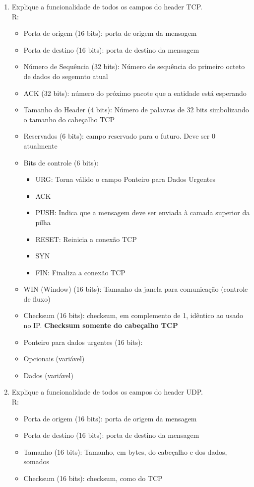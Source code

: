 \documentclass{article}
\begin{document}
\begin{enumerate}
	\item Explique a funcionalidade de todos os campos do header TCP.
	\\
	R: 
	\begin{itemize}
		\item Porta de origem (16 bits): porta de origem da mensagem
		\item Porta de destino (16 bits): porta de destino da mensagem
		\item Número de Sequência (32 bits): Número de sequência do primeiro octeto de dados do segemnto atual
		\item ACK (32 bits): número do próximo pacote que a entidade está esperando
		\item Tamanho do Header (4 bits): Número de palavras de 32 bits simbolizando o tamanho do cabeçalho TCP
		\item Reservados (6 bits): campo reservado para o futuro. Deve ser 0 atualmente
		\item Bits de controle (6 bits):
			\begin{itemize}
				\item URG: Torna válido o campo Ponteiro para Dados Urgentes
				\item ACK
				\item PUSH: Indica que a mensagem deve ser enviada à camada superior da pilha
				\item RESET: Reinicia a conexão TCP
				\item SYN
				\item FIN: Finaliza a conexão TCP
			\end{itemize}
		\item WIN (Window) (16 bits): Tamanho da janela para comunicação (controle de fluxo)
		\item Checksum (16 bits): checksum, em complemento de 1, idêntico ao usado no IP. \textbf{Checksum somente do cabeçalho TCP}
		\item Ponteiro para dados urgentes (16 bits):
		\item Opcionais (variável)
		\item Dados (variável)
	\end{itemize}

	
	\item Explique a funcionalidade de todos os campos do header UDP.
	\\
	R:
	\begin{itemize}
		\item Porta de origem (16 bits): porta de origem da mensagem
		\item Porta de destino (16 bits): porta de destino da mensagem
		\item Tamanho (16 bits): Tamanho, em bytes, do cabeçalho e dos dados, somados
		\item Checksum (16 bits): checksum, como do TCP 
	\end{itemize}


\end{enumerate}
\end{document}
